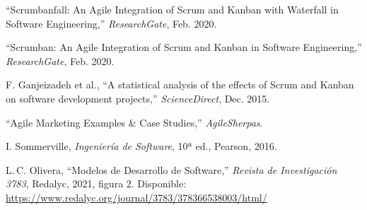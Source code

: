 \documentclass[conference]{IEEEtran}
\begin{document}
\begin{thebibliography}{00}
 ``Scrumbanfall: An Agile Integration of Scrum and Kanban with Waterfall in Software Engineering,'' \emph{ResearchGate}, Feb. 2020.

 ``Scrumban: An Agile Integration of Scrum and Kanban in Software Engineering,'' \emph{ResearchGate}, Feb. 2020.

 F. Ganjeizadeh et al., ``A statistical analysis of the effects of Scrum and Kanban on software development projects,'' \emph{ScienceDirect}, Dec. 2015.

 ``Agile Marketing Examples \& Case Studies,'' \emph{AgileSherpas}.

 I. Sommerville, \emph{Ingeniería de Software}, 10ª ed., Pearson, 2016.

L.\,C. Olivera, “Modelos de Desarrollo de Software,” \emph{Revista de Investigación 3783}, Redalyc, 2021, figura 2. Disponible: \url{https://www.redalyc.org/journal/3783/378366538003/html/}

\end{thebibliography}
\vspace{12pt}
\end{document}
